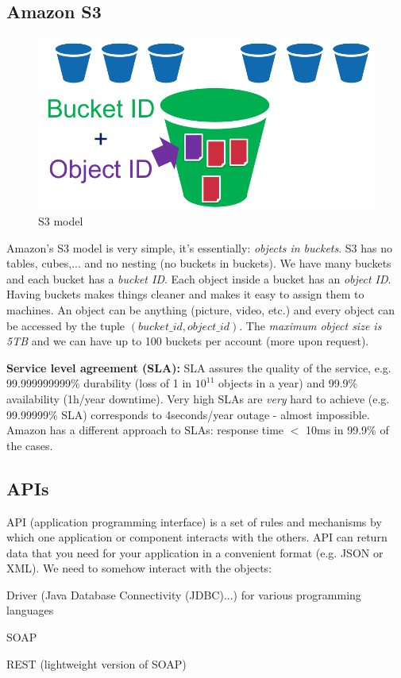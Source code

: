 \documentclass[11pt,oneside,a4paper]{article}
\begin{document}
\subsection{Amazon S3}

\begin{figure}
	\centering
	\includegraphics[width=0.2\linewidth]{figures/s3_buckets}
	\caption{S3 model}
	\label{fig:s3buckets}
\end{figure}

Amazon's S3 model is very simple, it's essentially: \textit{objects in buckets}. S3 has no tables, cubes,... and no nesting (no buckets in buckets). We have many buckets and each bucket has a \textit{bucket ID}. Each object inside a bucket has an \textit{object ID}. Having buckets makes things cleaner and makes it easy to assign them to machines. An object can be anything (picture, video, etc.) and every object can be accessed by the tuple $(bucket\_id, object\_id)$. The \textit{maximum object size is 5TB} and we can have up to 100 buckets per account (more upon request).

\textbf{Service level agreement (SLA):} SLA assures the quality of the service, e.g. 99.999999999\% durability (loss of 1 in $10^{11}$ objects in a year) and 99.9\% availability (1h/year downtime). Very high SLAs are \textit{very} hard to achieve (e.g. 99.99999\% SLA) corresponds to 4seconds/year outage - almost impossible. Amazon has a different approach to SLAs: response time $<$ 10ms in 99.9\% of the cases.

\subsection{APIs}

API (application programming interface) is a set of rules and mechanisms by which one application or component interacts with the others. API can return data that you need for your application in a convenient format (e.g. JSON or XML). We need to somehow interact with the objects:

\begin{compactitem}
	\item Driver (Java Database Connectivity (JDBC)...) for various programming languages
	\item SOAP
	\item REST (lightweight version of SOAP)\\
\end{compactitem}
\end{document}
